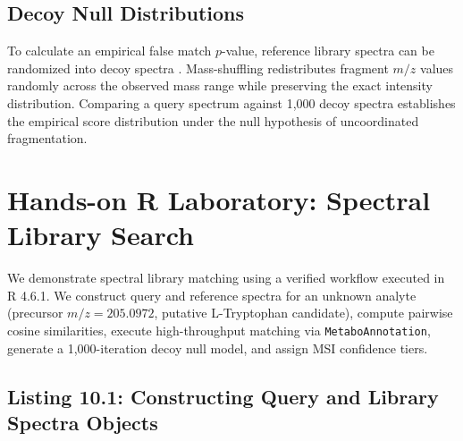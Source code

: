 \documentclass[11pt,twoside,openright]{book}
\begin{document}
\subsection{Decoy Null Distributions}
To calculate an empirical false match $p$-value, reference library spectra can be randomized into decoy spectra \cite{scheubert2017significance}. Mass-shuffling redistributes fragment $m/z$ values randomly across the observed mass range while preserving the exact intensity distribution. Comparing a query spectrum against 1,000 decoy spectra establishes the empirical score distribution under the null hypothesis of uncoordinated fragmentation.

\section{Hands-on R Laboratory: Spectral Library Search}

We demonstrate spectral library matching using a verified workflow executed in R 4.6.1. We construct query and reference spectra for an unknown analyte (precursor $m/z = 205.0972$, putative L-Tryptophan candidate), compute pairwise cosine similarities, execute high-throughput matching via \texttt{MetaboAnnotation}, generate a 1,000-iteration decoy null model, and assign MSI confidence tiers.

\subsection{Listing 10.1: Constructing Query and Library Spectra Objects}
\end{document}
